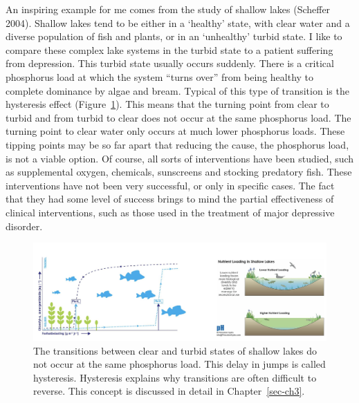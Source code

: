 \documentclass[
  a4paper,
  DIV=11,
  numbers=noendperiod]{scrreprt}
\begin{document}
An inspiring example for me comes from the study of shallow lakes
(Scheffer 2004). Shallow lakes tend to be either in a `healthy' state,
with clear water and a diverse population of fish and plants, or in an
`unhealthy' turbid state. I like to compare these complex lake systems
in the turbid state to a patient suffering from depression. This turbid
state usually occurs suddenly. There is a critical phosphorus load at
which the system ``turns over'' from being healthy to complete dominance
by algae and bream. Typical of this type of transition is the hysteresis
effect (Figure~\ref{fig-ch1-img2}). This means that the turning point
from clear to turbid and from turbid to clear does not occur at the same
phosphorus load. The turning point to clear water only occurs at much
lower phosphorus loads. These tipping points may be so far apart that
reducing the cause, the phosphorus load, is not a viable option. Of
course, all sorts of interventions have been studied, such as
supplemental oxygen, chemicals, sunscreens and stocking predatory fish.
These interventions have not been very successful, or only in specific
cases. The fact that they had some level of success brings to mind the
partial effectiveness of clinical interventions, such as those used in
the treatment of major depressive disorder.

\begin{figure}

{\centering \includegraphics{media/ch1/image2.jpg}

}

\caption{\label{fig-ch1-img2}The transitions between clear and turbid
states of shallow lakes do not occur at the same phosphorus load. This
delay in jumps is called hysteresis. Hysteresis explains why transitions
are often difficult to reverse. This concept is discussed in detail in
Chapter~\ref{sec-ch3}.}

\end{figure}
\end{document}
